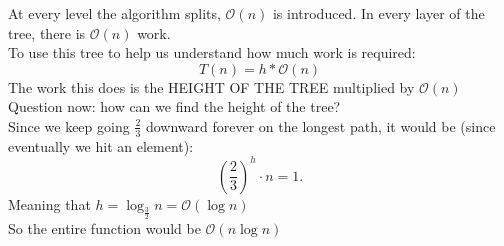 \begin{itemize}
\begin{example}
		At every level the algorithm splits, $\mathcal O\left( n \right) $ is introduced. In every layer of the tree, there is $\mathcal O(n)$ work.\\
		To use this tree to help us understand how much work is required:
		\begin{equation}
			T(n) = h * \mathcal O(n)
		\end{equation}
		The work this does is the HEIGHT OF THE TREE multiplied by $\mathcal O(n)$\\
		Question now: how can we find the height of the tree?\\
		Since we keep going  $\frac{2}{3}$ downward forever on the longest path, it would be (since eventually we hit an element):  \[
			\left( \frac{2}{3} \right) ^h \cdot  n = 1
		.\] 
		Meaning that $h = \log_{\frac{3}{2}}n = \mathcal O(\log n)$\\
		So the entire function would be $\mathcal O\left( n \log n \right) $
	\end{example}
\end{itemize}
